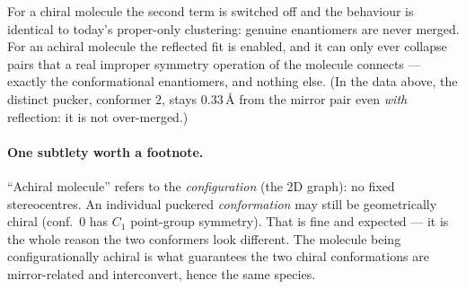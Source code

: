 \documentclass[11pt]{article}
\begin{document}
For a chiral molecule the second term is switched off and the behaviour is
identical to today's proper-only clustering: genuine enantiomers are never
merged. For an achiral molecule the reflected fit is enabled, and it can only
ever collapse pairs that a real improper symmetry operation of the molecule
connects --- exactly the conformational enantiomers, and nothing else. (In the
data above, the distinct pucker, conformer $2$, stays $0.33\,\text{\AA}$ from
the mirror pair even \emph{with} reflection: it is not over-merged.)

\paragraph{One subtlety worth a footnote.} ``Achiral molecule'' refers to the
\emph{configuration} (the 2D graph): no fixed stereocentres. An individual
puckered \emph{conformation} may still be geometrically chiral (conf.\ $0$ has
$C_1$ point-group symmetry). That is fine and expected --- it is the whole
reason the two conformers look different. The molecule being configurationally
achiral is what guarantees the two chiral conformations are mirror-related and
interconvert, hence the same species.
\end{document}
